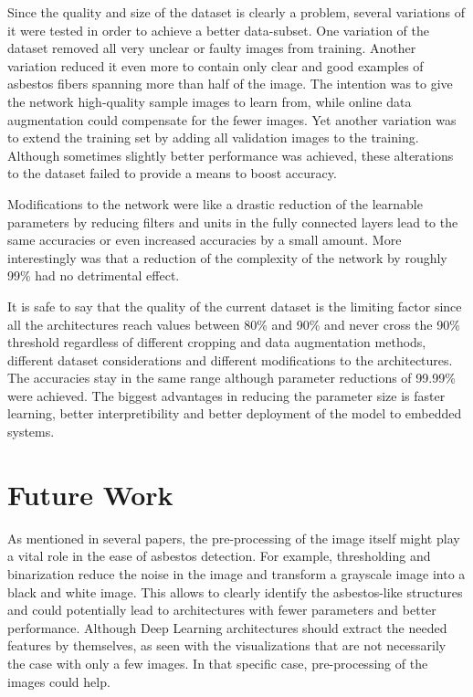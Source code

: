 Since the quality and size of the dataset is clearly a problem, several variations of it were tested in order to achieve a better data-subset. One variation of the dataset removed all very unclear or faulty images from training. Another variation reduced it even more to contain only clear and good examples of asbestos fibers spanning more than half of the image. The intention was to give the network high-quality sample images to learn from, while online data augmentation could compensate for the fewer images. Yet another variation was to extend the training set by adding all validation images to the training. Although sometimes slightly better performance was achieved, these alterations to the dataset failed to provide a means to boost accuracy.

Modifications to the network were like a drastic reduction of the learnable parameters by reducing filters and units in the fully connected layers lead to the same accuracies or even increased accuracies by a small amount. More interestingly was that a reduction of the complexity of the network by roughly 99\% had no detrimental effect.

It is safe to say that the quality of the current dataset is the limiting factor since all the architectures reach values between 80\% and 90\% and never cross the 90\% threshold regardless of different cropping and data augmentation methods, different dataset considerations and different modifications to the architectures. The accuracies stay in the same range although parameter reductions of 99.99\% were achieved. The biggest advantages in reducing the parameter size is faster learning, better interpretibility and better deployment of the model to embedded systems.

\section{Future Work}

As mentioned in several papers, the pre-processing of the image itself might play a vital role in the ease of asbestos detection. For example, thresholding and binarization reduce the noise in the image and transform a grayscale image into a black and white image. This allows to clearly identify the asbestos-like structures and could potentially lead to architectures with fewer parameters and better performance. Although Deep Learning architectures should extract the needed features by themselves, as seen with the visualizations that are not necessarily the case with only a few images. In that specific case, pre-processing of the images could help.\\

